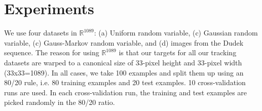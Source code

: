 %
%
%
%
\section{Experiments}
We use four datasets in $\mathbb{R}^{1089}$: (a) Uniform random variable, (c) Gaussian random variable, (c) Gauss-Markov random variable, and (d) images from the Dudek sequence. The reason for using $\mathbb{R}^{1089}$ is that our targets for all our tracking datasets are warped to a canonical size of 33-pixel height and 33-pixel width (33x33=1089). In all cases, we take 100 examples and split them up using an 80/20 rule, i.e. 80 training examples and 20 test examples. 10 cross-validation runs are used. In each cross-validation run, the training and test examples are picked randomly in the 80/20 ratio.
